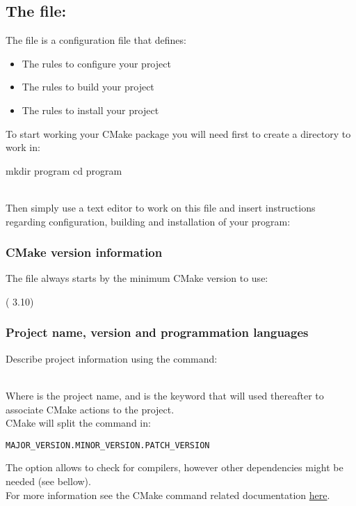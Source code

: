 \subsection{The file: } 

The file  is a configuration file that defines:  
\begin{itemize}
\item The rules to configure your project
\item The rules to build your project
\item The rules to install your project
\end{itemize}
To start working your CMake package you will need first to create a directory to work in:
\begin{script}
\fprompt{~} mkdir program
\fprompt{~} cd program
\end{script}
\\[-0.25cm]
\noindent Then simply use a text editor to work on this file and insert instructions regarding configuration, building and installation of your program:
\begin{script}
  
\end{script}

\subsubsection*{CMake version information}

The file  always starts by the minimum CMake version to use: 
\begin{script}
 ( 3.10)
\end{script}

\subsubsection*{Project name, version and programmation languages}
\label{cmake_pname}

Describe project information using the  command:
\begin{script}
\end{script}
\\[-0.25cm]
\noindent Where  is the project name, and is the keyword that will used thereafter to associate CMake actions to the project. \\ 
CMake will split the  command in:
\begin{center}\texttt{MAJOR\_VERSION.MINOR\_VERSION.PATCH\_VERSION} \end{center}
The  option allows to check for compilers, however other dependencies might be needed (see bellow). \\[0.25cm]
For more information see the CMake  command related documentation \href{https://cmake.org/cmake/help/latest/command/project.html\#command:project}{here}.


